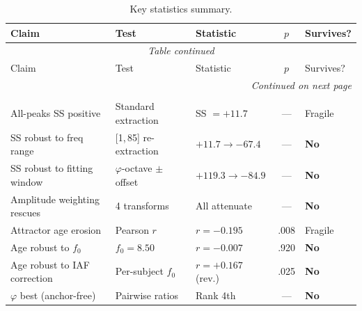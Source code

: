 \documentclass[11pt,a4paper]{article}
\newcommand{\phisym}{\varphi}
\newcommand{\fzero}{f_0}
\begin{document}
\begin{longtable}{p{4cm}p{3.5cm}p{2.5cm}cl}
\caption{Key statistics summary.} \\
\toprule
Claim & Test & Statistic & $p$ & Survives? \\
\midrule
\endfirsthead
\multicolumn{5}{c}{\textit{Table continued}} \\
\toprule
Claim & Test & Statistic & $p$ & Survives? \\
\midrule
\endhead
\midrule
\multicolumn{5}{r}{\textit{Continued on next page}} \\
\endfoot
\bottomrule
\endlastfoot

\multicolumn{5}{l}{\textbf{Part I: Diagnostic}} \\
All-peaks SS positive & Standard extraction & SS $= +11.7$ & --- & Fragile \\
SS robust to freq range & [1,\,85] re-extraction & $+11.7 \to -67.4$ & --- & \textbf{No} \\
SS robust to fitting window & $\phisym$-octave $\pm$ offset & $+119.3 \to -84.9$ & --- & \textbf{No} \\
Amplitude weighting rescues & 4 transforms & All attenuate & --- & \textbf{No} \\
Attractor age erosion & Pearson $r$ & $r = -0.195$ & .008 & Fragile \\
Age robust to $\fzero$ & $\fzero = 8.50$ & $r = -0.007$ & .920 & \textbf{No} \\
Age robust to IAF correction & Per-subject $\fzero$ & $r = +0.167$ (rev.) & .025 & \textbf{No} \\
$\phisym$ best (anchor-free) & Pairwise ratios & Rank 4th & --- & \textbf{No} \\


\end{longtable}
\end{document}
